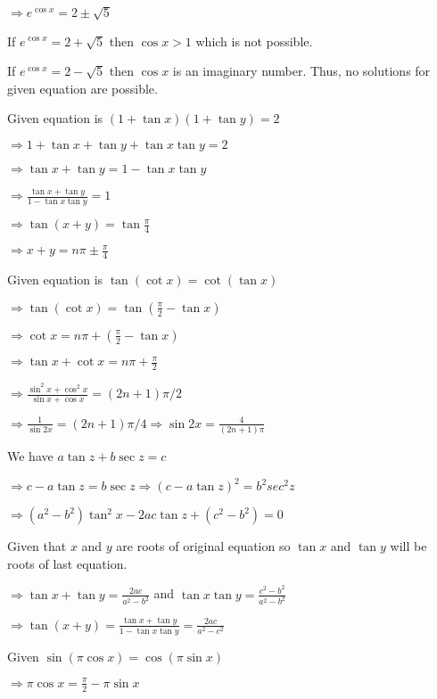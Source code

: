   $\Rightarrow e^{\cos x} = 2\pm\sqrt{5}$

  If $e^{\cos x} = 2 + \sqrt{5}$ then $\cos x > 1$ which is not possible.

  If $e^{\cos x} = 2 - \sqrt{5}$ then $\cos x$ is an imaginary number. Thus, no solutions for given equation are
  possible.

\item Given equation is $(1 + \tan x)(1 + \tan y) = 2$

  $\Rightarrow 1 + \tan x + \tan y + \tan x\tan y = 2$

  $\Rightarrow \tan x + \tan y = 1 - \tan x\tan y$

  $\Rightarrow \frac{\tan x + \tan y}{1 - \tan x\tan y} = 1$

  $\Rightarrow \tan(x + y) = \tan\frac{\pi}{4}$

  $\Rightarrow x + y = n\pi\pm\frac{\pi}{4}$

\item Given equation is $\tan(\cot x) = \cot(\tan x)$

  $\Rightarrow \tan(\cot x) = \tan\left(\frac{\pi}{2} - \tan x\right)$

  $\Rightarrow \cot x = n\pi + \left(\frac{\pi}{2} - \tan x\right)$

  $\Rightarrow \tan x + \cot x = n\pi + \frac{\pi}{2}$

  $\Rightarrow \frac{\sin^2x + \cos^2x}{\sin x + \cos x} = (2n + 1)\pi/2$

  $\Rightarrow \frac{1}{\sin2x} = (2n + 1)\pi/4 \Rightarrow \sin2x = \frac{4}{(2n + 1)\pi}$

\item We have $a\tan z+ b\sec z = c$

  $\Rightarrow c - a\tan z = b\sec z \Rightarrow (c - a\tan z)^2 = b^2sec^2z$

  $\Rightarrow (a^2 - b^2)\tan^2x -2ac\tan z + (c^2 - b^2) = 0$

  Given that $x$ and $y$ are roots of original equation so $\tan x$ and $\tan y$ will be roots of last
  equation.

  $\Rightarrow \tan x + \tan y = \frac{2ac}{a^2 - b^2}$ and $\tan x\tan y = \frac{c^2 - b^2}{a^2 - b^2}$

  $\Rightarrow \tan(x + y) = \frac{\tan x + \tan y}{1 - \tan x\tan y} = \frac{2ac}{a^2 - c^2}$

\item Given $\sin(\pi\cos x) = \cos(\pi\sin x)$

  $\Rightarrow \pi\cos x = \frac{\pi}{2} - \pi\sin x$

